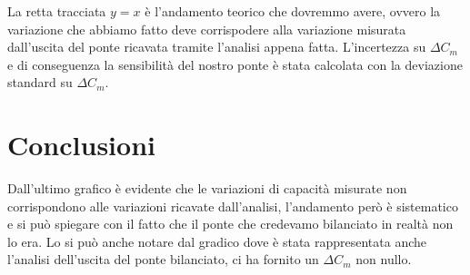 \documentclass[12pt,]{article}
\begin{document}
La retta tracciata $y=x$ è l'andamento teorico che dovremmo avere, ovvero la variazione che abbiamo fatto deve corrispodere alla variazione misurata dall'uscita del ponte ricavata tramite l'analisi appena fatta. L'incertezza su $\Delta C_m$ e di conseguenza la sensibilità del nostro ponte è stata calcolata con la deviazione standard su $\Delta C_m$.
\section{Conclusioni}
Dall'ultimo grafico è evidente che le variazioni di capacità misurate non corrispondono alle variazioni ricavate dall'analisi, l'andamento però è sistematico e si può spiegare con il fatto che il ponte che credevamo bilanciato in realtà non lo era. Lo si può anche notare dal gradico dove è stata rappresentata anche l'analisi dell'uscita del ponte bilanciato, ci ha fornito un $\Delta C_m$ non nullo.
\end{document}
